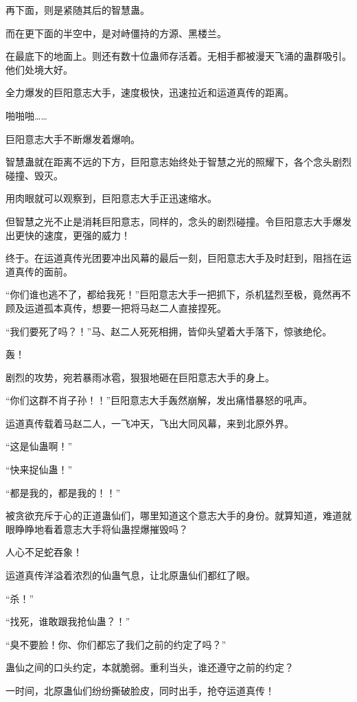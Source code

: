 \begin{this_body}
再下面，则是紧随其后的智慧蛊。

而在更下面的半空中，是对峙僵持的方源、黑楼兰。

在最底下的地面上。则还有数十位蛊师存活着。无相手都被漫天飞涌的蛊群吸引。他们处境大好。

全力爆发的巨阳意志大手，速度极快，迅速拉近和运道真传的距离。

啪啪啪……

巨阳意志大手不断爆发着爆响。

智慧蛊就在距离不远的下方，巨阳意志始终处于智慧之光的照耀下，各个念头剧烈碰撞、毁灭。

用肉眼就可以观察到，巨阳意志大手正迅速缩水。

但智慧之光不止是消耗巨阳意志，同样的，念头的剧烈碰撞。令巨阳意志大手爆发出更快的速度，更强的威力！

终于。在运道真传光团要冲出风幕的最后一刻，巨阳意志大手及时赶到，阻挡在运道真传的面前。

“你们谁也逃不了，都给我死！”巨阳意志大手一把抓下，杀机猛烈至极，竟然再不顾及运道孤本真传，想要一把将马赵二人直接捏死。

“我们要死了吗？！”马、赵二人死死相拥，皆仰头望着大手落下，惊骇绝伦。

轰！

剧烈的攻势，宛若暴雨冰雹，狠狠地砸在巨阳意志大手的身上。

“你们这群不肖子孙！！”巨阳意志大手轰然崩解，发出痛惜暴怒的吼声。

运道真传载着马赵二人，一飞冲天，飞出大同风幕，来到北原外界。

“这是仙蛊啊！”

“快来捉仙蛊！”

“都是我的，都是我的！！”

被贪欲充斥于心的正道蛊仙们，哪里知道这个意志大手的身份。就算知道，难道就眼睁睁地看着意志大手将仙蛊捏爆摧毁吗？

人心不足蛇吞象！

运道真传洋溢着浓烈的仙蛊气息，让北原蛊仙们都红了眼。

“杀！”

“找死，谁敢跟我抢仙蛊？！”

“臭不要脸！你、你们都忘了我们之前的约定了吗？”

蛊仙之间的口头约定，本就脆弱。重利当头，谁还遵守之前的约定？

一时间，北原蛊仙们纷纷撕破脸皮，同时出手，抢夺运道真传！


\end{this_body}
